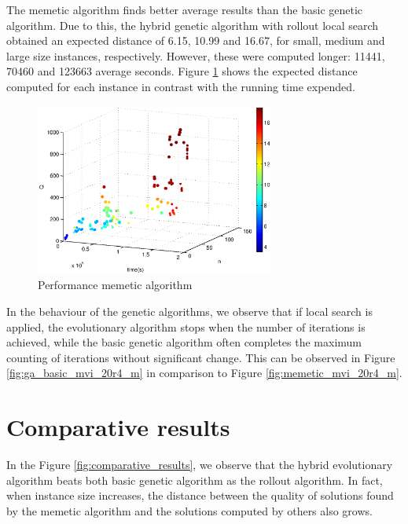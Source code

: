 The memetic algorithm finds better average results than the basic genetic algorithm. Due to this, the hybrid genetic algorithm with rollout local search obtained an expected distance of 6.15, 10.99 and 16.67, for small, medium and large size instances, respectively. However, these were computed longer: 11441, 70460 and 123663 average seconds. Figure \ref{fig:compare_expected_distance_memetic} shows the expected distance computed for each instance in contrast with the running time expended.


\begin{figure}[!htbp]
  \begin{center}
   \includegraphics[width=0.7\textwidth]{Images/Chapter5/compare_expected_distance_memetic.eps}
  \end{center}
    \caption{Performance memetic algorithm}\label{fig:compare_expected_distance_memetic}
\end{figure}


In the behaviour of the genetic algorithms, we observe that if local search is applied, the evolutionary algorithm stops when the number of iterations is achieved, while the basic genetic algorithm often completes the maximum counting of iterations without significant change. This can be observed in Figure \ref{fig:ga_basic_mvi_20r4_m} in comparison to Figure \ref{fig:memetic_mvi_20r4_m}.


\section{Comparative results}

In the Figure \ref{fig:comparative_results}, we observe that the hybrid evolutionary algorithm beats both basic genetic algorithm as the rollout algorithm. In fact, when instance size increases, the distance between the quality of solutions found by the memetic algorithm and the solutions computed by others also grows.

